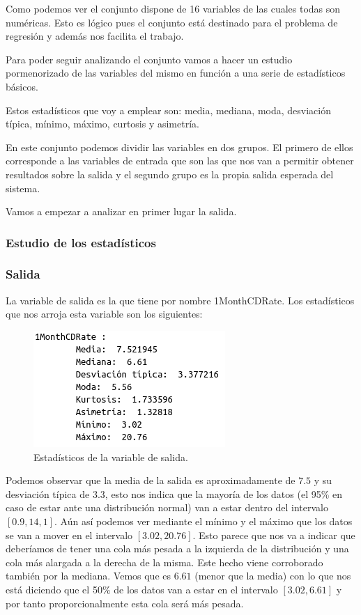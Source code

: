 \documentclass[12pt,a4paper]{article}
\begin{document}
Como podemos ver el conjunto dispone de 16 variables de las cuales todas son numéricas. Esto es lógico pues el conjunto está destinado para el problema de regresión y además nos facilita el trabajo. 

Para poder seguir analizando el conjunto vamos a hacer un estudio pormenorizado de las variables del mismo en función a una serie de estadísticos básicos.

Estos estadísticos que voy a emplear son: media, mediana, moda, desviación típica, mínimo, máximo, curtosis y asimetría.

En este conjunto podemos dividir las variables en dos grupos. El primero de ellos corresponde a las variables de entrada que son las que nos van a permitir obtener resultados sobre la salida y el segundo grupo es la propia salida esperada del sistema.

Vamos a empezar a analizar en primer lugar la salida.

\subsubsection{Estudio de los estadísticos}

\subsubsection*{Salida}
La variable de salida es la que tiene por nombre 1MonthCDRate. Los estadísticos que nos arroja esta variable son los siguientes:

\begin{figure}[H]
	\centering
	\includegraphics[scale=0.7]{./Imagenes/EDA/Regresion/estadisticos_1MonthCDRate.png}
	\caption{Estadísticos de la variable de salida.}
\end{figure}

Podemos observar que la  media de la salida es aproximadamente de $7.5$ y su desviación típica de $3.3$, esto nos indica que la mayoría de los datos (el 95\% en caso de estar ante una distribución normal) van a estar dentro del intervalo $[0.9,14,1]$. Aún así podemos ver mediante el mínimo y el máximo que los datos se van a mover en el intervalo $[3.02, 20.76]$. Esto parece que nos va a indicar que deberíamos de tener una cola más pesada a la izquierda de la distribución y una cola más alargada a la derecha de la misma. Este hecho viene corroborado también por la mediana. Vemos que es $6.61$ (menor que la media) con lo que nos está diciendo que el 50\% de los datos van a estar en el intervalo $[3.02, 6.61]$ y por tanto proporcionalmente esta cola será más pesada.
\end{document}
